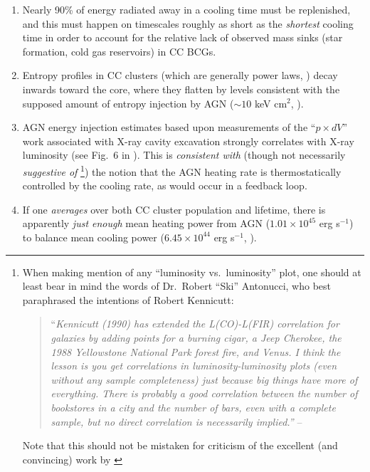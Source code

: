 \begin{enumerate}
\item Nearly 90\% of energy radiated away in a cooling time must be replenished, and this must happen on timescales 
roughly as short as the {\it shortest} cooling time in order to account for the relative lack of observed mass sinks (star formation, 
cold gas reservoirs) in CC BCGs. 


\item Entropy profiles in CC clusters (which are generally power laws, \citealt{piffaretti05}) decay inwards toward the core, where
they flatten by levels consistent with the supposed amount of entropy injection by AGN ($\sim10$ keV cm$^2$, \citealt{mccarthy04,markmegan05}).  




\item AGN energy injection estimates based upon measurements of the ``$p \times dV$'' work associated with X-ray cavity 
excavation strongly correlates with X-ray luminosity (see Fig.~6 in \citealt{rafferty06}). This is {\it consistent with} (though not necessarily 
{\it suggestive of} \footnote{When making mention of any ``luminosity vs.~luminosity'' plot, 
one should at least bear in mind the words of Dr.~Robert ``Ski'' Antonucci, who best paraphrased the intentions of Robert Kennicutt:
\begin{quotation}
``{\it Kennicutt (1990) has extended the L(CO)-L(FIR) correlation for galaxies by adding points for a burning cigar, a Jeep Cherokee, the 1988 Yellowstone National Park 
forest fire, and Venus. I think the lesson is you get correlations in luminosity-luminosity plots (even without any sample completeness) just because 
big things have more of everything. There is probably a good correlation between the number of bookstores in a city and the number of bars, even 
with a complete sample, but no direct correlation is necessarily implied.''} -- \citet{antonucci99}
\end{quotation}Note that this should not be mistaken for criticism of the excellent (and convincing) work by \citet{rafferty06}}) 
the notion that the AGN heating rate is thermostatically controlled by the cooling rate, as would occur in a feedback loop. 
 

\item If one {\it averages} over both CC cluster population and lifetime, there is apparently {\it just enough} 
mean heating power from AGN ($1.01\times10^{45}$ erg s$^{-1}$) 
to balance mean cooling power ($6.45\times10^{44}$ erg s$^{-1}$, \citealt{rafferty06}). 



\end{enumerate}




